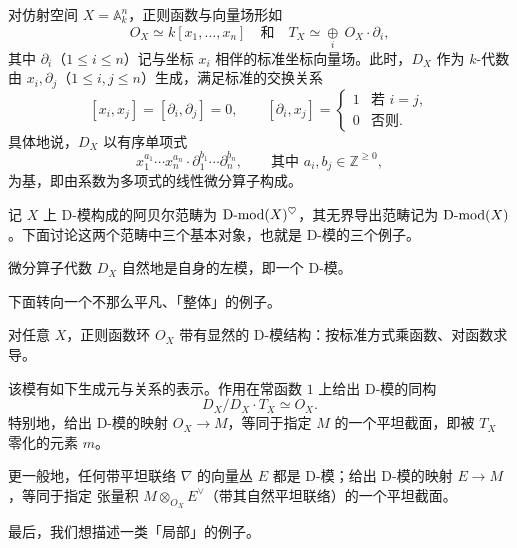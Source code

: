 \begin{ex} 对仿射空间 $X=\mathbb{A}^n_k$，正则函数与向量场形如
\[
O_X\simeq k[x_1,\ldots,x_n]\quad\text{和}\quad T_X\simeq
\underset{i}{\oplus}\ O_X\cdot\partial_i,
\]
其中 $\partial_i$（$1\leqslant i\leqslant n$）记与坐标 $x_i$ 相伴的标准坐标向量场。此时，$D_X$
作为 $k$-代数由 $x_i,\partial_j$（$1\leqslant i,j\leqslant n$）生成，满足标准的交换关系
\[
[x_i,x_j]=[\partial_i,\partial_j]=0,\qquad
[\partial_i,x_j]=\begin{cases}1 & \text{若 } i=j,\\ 0 & \text{否则}.\end{cases}
\]
具体地说，$D_X$ 以有序单项式
\[
x_1^{a_1}\cdots x_n^{a_n}\cdot\partial_1^{b_1}\cdots\partial_n^{b_n},\qquad
\text{其中 } a_i,b_j\in\mathbb{Z}^{\geqslant 0},
\]
为基，即由系数为多项式的线性微分算子构成。
\end{ex}

记 $X$ 上 D-模构成的阿贝尔范畴为 $\operatorname{D-mod}(X)^\heartsuit$，其无界导出范畴记为
$\operatorname{D-mod}(X)$。下面讨论这两个范畴中三个基本对象，也就是 D-模的三个例子。

\begin{ex} 微分算子代数 $D_X$ 自然地是自身的左模，即一个 D-模。
\end{ex}

下面转向一个不那么平凡、「整体」的例子。

\begin{ex} 对任意 $X$，正则函数环 $O_X$ 带有显然的 D-模结构：按标准方式乘函数、对函数求导。

该模有如下生成元与关系的表示。作用在常函数 $1$ 上给出 D-模的同构
\[
D_X/D_X\cdot T_X\simeq O_X.
\]
特别地，给出 D-模的映射 $O_X\to M$，等同于指定 $M$ 的一个平坦截面，即被 $T_X$ 零化的元素 $m$。

更一般地，任何带平坦联络 $\nabla$ 的向量丛 $E$ 都是 D-模；给出 D-模的映射 $E\to M$，等同于指定
张量积 $M\otimes_{O_X}E^\vee$（带其自然平坦联络）的一个平坦截面。
\end{ex}

最后，我们想描述一类「局部」的例子。

